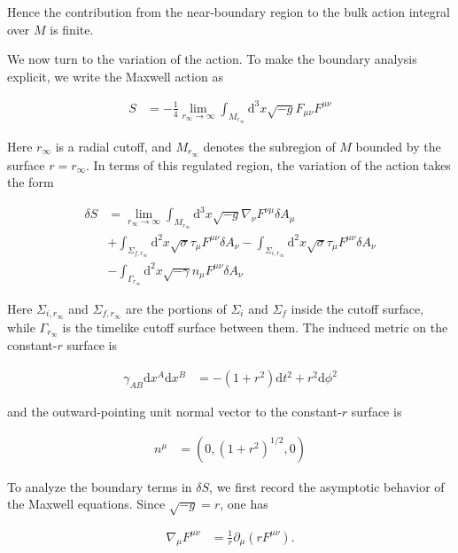 Hence the contribution from the near-boundary region to the bulk action integral over $M$ is finite.

We now turn to the variation of the action. To make the boundary analysis explicit, we write the Maxwell action as

\begin{align}
S & =-\frac{1}{4}\lim_{ r_{\infty} \to \infty }\int _{M_{r_{\infty}}}\mathrm{d}^{3}x\sqrt{ -g }F_{\mu \nu}F^{\mu \nu}
\end{align}

Here $r_{\infty}$ is a radial cutoff, and $M_{r_{\infty}}$ denotes the subregion of $M$ bounded by the surface $r=r_{\infty}$. In terms of this regulated region, the variation of the action takes the form

\begin{align}
\delta S & =\lim_{ r_{\infty} \to \infty }\int _{M_{r_{\infty}}}\mathrm{d}^{3}x\sqrt{ -g }\nabla _{\nu}F^{\nu \mu}\delta A_{\mu} \\
 & +\int _{\Sigma _{f,r_{\infty}}}\mathrm{d}^{2}x\sqrt{ \sigma }\tau _{\mu}F^{\mu \nu}\delta A_{\nu}-\int _{\Sigma _{i,r_{\infty}}}\mathrm{d}^{2}x\sqrt{ \sigma }\tau _{\mu}F^{\mu \nu}\delta A_{\nu} \\
 & -\int _{\Gamma _{r_{\infty}}}\mathrm{d}^{2}x\sqrt{ -\gamma }n_{\mu}F^{\mu \nu}\delta A_{\nu}
\end{align}

Here $\Sigma _{i,r_{\infty}}$ and $\Sigma _{f,r_{\infty}}$ are the portions of $\Sigma _{i}$ and $\Sigma _{f}$ inside the cutoff surface, while $\Gamma _{r_{\infty}}$ is the timelike cutoff surface between them. The induced metric on the constant-$r$ surface is

\begin{align}
\gamma _{AB}\mathrm{d}x^{A}\mathrm{d}x^{B} & =-(1+r^{2})\mathrm{d}t^{2}+r^{2}\mathrm{d}\phi ^{2}
\end{align}

and the outward-pointing unit normal vector to the constant-$r$ surface is

\begin{align}
n^{\mu} & =\left(0,(1+r^{2})^{1/2},0\right)
\end{align}

To analyze the boundary terms in $\delta S$, we first record the asymptotic behavior of the Maxwell equations. Since $\sqrt{-g}=r$, one has

\begin{align}
\nabla _{\mu}F^{\mu \nu} & =\frac{1}{r}\partial _{\mu}(rF^{\mu \nu}).
\end{align}

